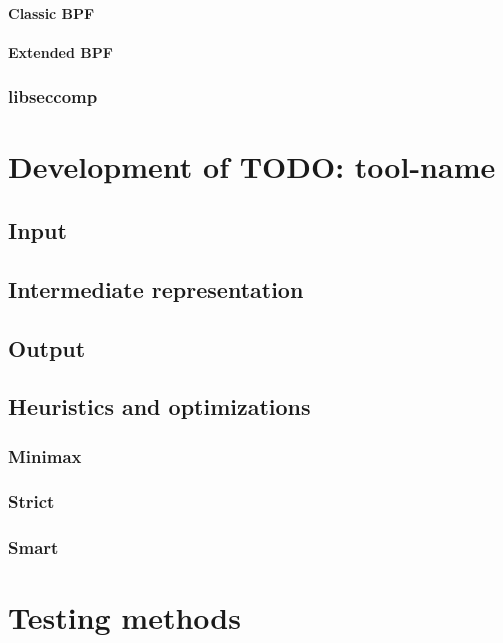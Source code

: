 \subsubsection{Classic BPF}
\subsubsection{Extended BPF}

\subsection{libseccomp}


\chapter{Development of TODO: tool-name}
\section{Input}
\section{Intermediate representation}
\section{Output}
\section{Heuristics and optimizations}
\subsection{Minimax}
\subsection{Strict}
\subsection{Smart}


\chapter{Testing methods}


